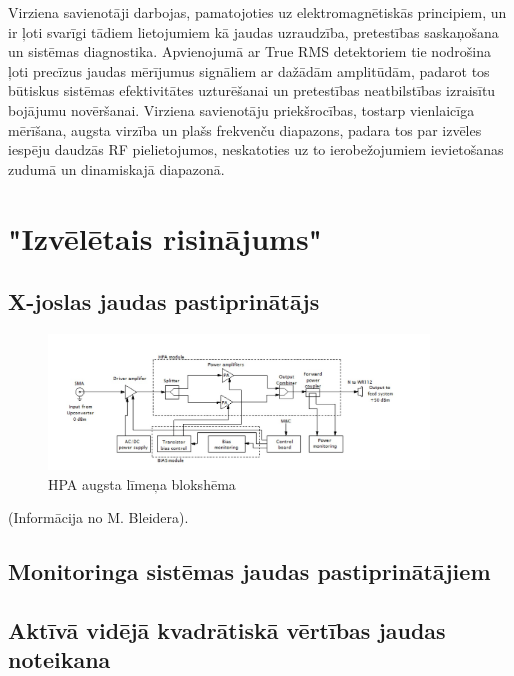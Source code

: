 Virziena savienotāji darbojas, pamatojoties uz elektromagnētiskās principiem, un ir ļoti svarīgi tādiem lietojumiem kā jaudas uzraudzība, pretestības saskaņošana un sistēmas diagnostika. Apvienojumā ar True RMS detektoriem tie nodrošina ļoti precīzus jaudas mērījumus signāliem ar dažādām amplitūdām, padarot tos būtiskus sistēmas efektivitātes uzturēšanai un pretestības neatbilstības izraisītu bojājumu novēršanai. Virziena savienotāju priekšrocības, tostarp vienlaicīga mērīšana, augsta virzība un plašs frekvenču diapazons, padara tos par izvēles iespēju daudzās RF pielietojumos, neskatoties uz to ierobežojumiem ievietošanas zudumā un dinamiskajā diapazonā.

\section{"Izvēlētais risinājums"}
\subsection{X-joslas jaudas pastiprinātājs}
\begin{figure}[H]
	\centering
    \includegraphics[width=0.9\textwidth]{bildes/HPA.jpg}\hspace{1cm}
    \caption{HPA augsta līmeņa blokshēma}
\end{figure}
(Informācija no M. Bleidera).
\subsection{Monitoringa sistēmas jaudas pastiprinātājiem}

\subsection{Aktīvā vidējā kvadrātiskā vērtības jaudas noteikana}
